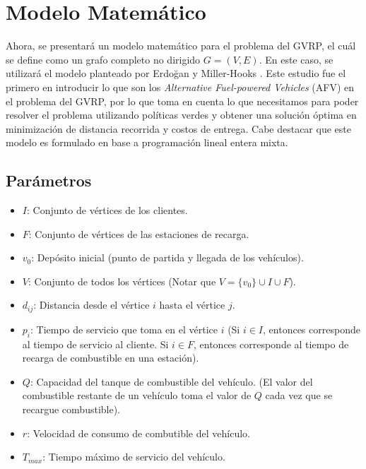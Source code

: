 \documentclass[letter, 10pt]{article}
\begin{document}



\section{Modelo Matem\'atico}
\label{modelo}
Ahora, se presentará un modelo matemático para el problema del GVRP, el cuál se define como un grafo completo no dirigido $G = (V,E)$. En este caso, se utilizará el modelo planteado por Erdoğan y Miller-Hooks \cite{ERDOGANMILLERHOOKS}. Este estudio fue el primero en introducir lo que son los \emph{Alternative Fuel-powered Vehicles} (AFV) en el problema del GVRP, por lo que toma en cuenta lo que necesitamos para poder resolver el problema utilizando políticas verdes y obtener una solución óptima en minimización de distancia recorrida y costos de entrega. Cabe destacar que este modelo es formulado en base a programación lineal entera mixta.

\subsection{Parámetros}
\begin{itemize}
    \item $I$: Conjunto de vértices de los clientes.
    \item $F$: Conjunto de vértices de las estaciones de recarga.
    \item $v_0$: Depósito inicial (punto de partida y llegada de los vehículos).
    \item $V$: Conjunto de todos los vértices (Notar que $V = \{v_0\} \cup I \cup F$).
    \item $d_{ij}$: Distancia desde el vértice $i$ hasta el vértice $j$.
    \item $p_i$: Tiempo de servicio que toma en el vértice $i$ (Si $i \in I$, entonces corresponde al tiempo de servicio al cliente. Si $i \in F$, entonces corresponde al tiempo de recarga de combustible en una estación).
    \item $Q$: Capacidad del tanque de combustible del vehículo.  (El valor del combustible restante de un vehículo toma el valor de $Q$ cada vez que se recargue combustible).
    \item $r$: Velocidad de consumo de combutible del vehículo.
    \item $T_{max}$: Tiempo máximo de servicio del vehículo.
\end{itemize}
\end{document}
